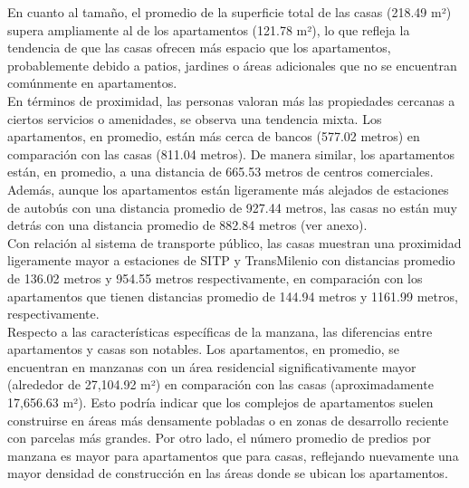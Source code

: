 \documentclass[12pt]{article}
\begin{document}
En cuanto al tamaño, el promedio de la superficie total de las casas (218.49 m²) supera ampliamente al de los apartamentos (121.78 m²), lo que refleja la tendencia de que las casas ofrecen más espacio que los apartamentos, probablemente debido a patios, jardines o áreas adicionales que no se encuentran comúnmente en apartamentos. \\

En términos de proximidad,  las personas valoran más las propiedades cercanas a ciertos servicios o amenidades, se observa una tendencia mixta. Los apartamentos, en promedio, están más cerca de bancos (577.02 metros) en comparación con las casas (811.04 metros). De manera similar, los apartamentos están, en promedio, a una distancia de 665.53 metros de centros comerciales. Además, aunque los apartamentos están ligeramente más alejados de estaciones de autobús con una distancia promedio de 927.44 metros, las casas no están muy detrás con una distancia promedio de 882.84 metros (ver anexo). \\

Con relación al sistema de transporte público, las casas muestran una proximidad ligeramente mayor a estaciones de SITP y TransMilenio con distancias promedio de 136.02 metros y 954.55 metros respectivamente, en comparación con los apartamentos que tienen distancias promedio de 144.94 metros y 1161.99 metros, respectivamente. \\

Respecto a las características específicas de la manzana, las diferencias entre apartamentos y casas son notables. Los apartamentos, en promedio, se encuentran en manzanas con un área residencial significativamente mayor (alrededor de 27,104.92 m²) en comparación con las casas (aproximadamente 17,656.63 m²). Esto podría indicar que los complejos de apartamentos suelen construirse en áreas más densamente pobladas o en zonas de desarrollo reciente con parcelas más grandes. Por otro lado, el número promedio de predios por manzana es mayor para apartamentos que para casas, reflejando nuevamente una mayor densidad de construcción en las áreas donde se ubican los apartamentos. \\
\end{document}

